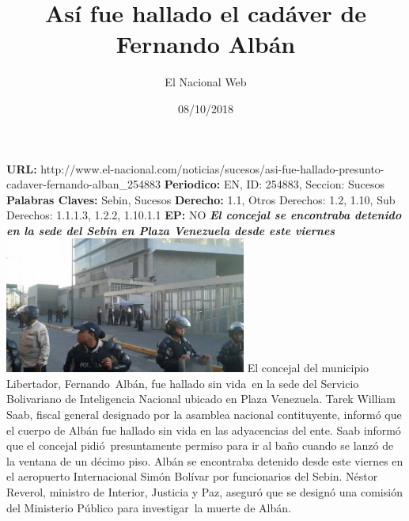 \documentclass{article}%
\title{\textbf{Así fue hallado el cadáver de Fernando Albán}}%
\author{El Nacional Web}%
\date{08/10/2018}%
\begin{document}
%
\normalsize%
\maketitle%
\textbf{URL: }%
http://www.el{-}nacional.com/noticias/sucesos/asi{-}fue{-}hallado{-}presunto{-}cadaver{-}fernando{-}alban\_254883\newline%
%
\textbf{Periodico: }%
EN, %
ID: %
254883, %
Seccion: %
Sucesos\newline%
%
\textbf{Palabras Claves: }%
Sebin, Sucesos\newline%
%
\textbf{Derecho: }%
1.1, %
Otros Derechos: %
1.2, 1.10, %
Sub Derechos: %
1.1.1.3, 1.2.2, 1.10.1.1\newline%
%
\textbf{EP: }%
NO\newline%
\newline%
%
\textbf{\textit{El concejal se encontraba detenido en la sede del Sebin en Plaza Venezuela desde este viernes~}}%
\newline%
\newline%
%
\includegraphics[width=300px]{255.jpg}%
\newline%
%
El concejal del municipio Libertador, Fernando~Albán, fue hallado sin vida~en la sede del Servicio Bolivariano de Inteligencia Nacional ubicado en Plaza Venezuela.%
\newline%
%
Tarek William Saab, fiscal general designado por la asamblea nacional contituyente, informó que el cuerpo de Albán fue hallado sin vida en las adyacencias del ente. Saab informó que el concejal pidió~presuntamente permiso para ir al baño cuando se lanzó de la ventana de un décimo piso.%
\newline%
%
Albán se encontraba detenido desde este viernes en el aeropuerto Internacional Simón Bolívar por funcionarios del Sebin. Néstor Reverol, ministro de Interior, Justicia y Paz, aseguró que se designó una comisión del Ministerio Público para investigar~la muerte de Albán.%
\newline%
%
\end{document}
